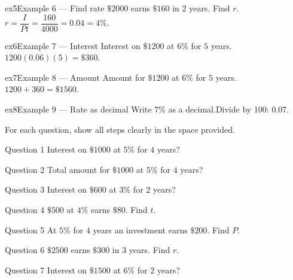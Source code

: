 \documentclass[11pt]{article}
\begin{document}
\begin{example}{ex5}{Example 6 --- Find rate}
$\$2000$ earns $\$160$ in $2$ years. Find $r$.\soln $r=\dfrac{I}{Pt}=\dfrac{160}{4000}=0.04=4\%$.
\end{example}

\begin{example}{ex6}{Example 7 --- Interest}
Interest on $\$1200$ at $6\%$ for $5$ years.\soln $1200(0.06)(5)=\$360$.
\end{example}

\begin{example}{ex7}{Example 8 --- Amount}
Amount for $\$1200$ at $6\%$ for $5$ years.\soln $1200+360=\$1560$.
\end{example}

\begin{example}{ex8}{Example 9 --- Rate as decimal}
Write $7\%$ as a decimal.\soln Divide by 100: $0.07$.
\end{example}

\clearpage
{}
For each question, show all steps clearly in the space provided.

\begin{qbox}{Question 1}
Interest on $\$1000$ at $5\%$ for $4$ years?\workspace{2.4cm}
\end{qbox}

\begin{qbox}{Question 2}
Total amount for $\$1000$ at $5\%$ for $4$ years?\workspace{2.4cm}
\end{qbox}

\begin{qbox}{Question 3}
Interest on $\$600$ at $3\%$ for $2$ years?\workspace{2.4cm}
\end{qbox}

\begin{qbox}{Question 4}
$\$500$ at $4\%$ earns $\$80$. Find $t$.\workspace{2.4cm}
\end{qbox}

\begin{qbox}{Question 5}
At $5\%$ for $4$ years an investment earns $\$200$. Find $P$.\workspace{2.4cm}
\end{qbox}

\begin{qbox}{Question 6}
$\$2500$ earns $\$300$ in $3$ years. Find $r$.\workspace{2.4cm}
\end{qbox}

\begin{qbox}{Question 7}
Interest on $\$1500$ at $6\%$ for $2$ years?\workspace{2.4cm}
\end{qbox}
\end{document}
